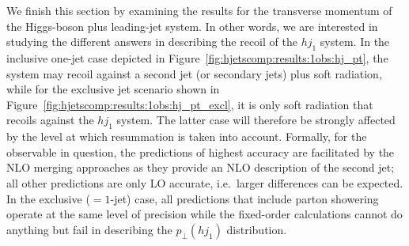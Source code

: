 We finish this section by examining the results for the transverse
momentum of the Higgs-boson plus leading-jet system. In other words,
we are interested in studying the different answers in describing the
recoil of the $hj_1$ system. In the inclusive one-jet case depicted in
Figure~\ref{fig:hjetscomp:results:1obs:hj_pt}, the system may recoil
against a second jet (or secondary jets) plus soft radiation, while
for the exclusive jet scenario shown in
Figure~\ref{fig:hjetscomp:results:1obs:hj_pt_excl}, it is only soft
radiation that recoils against the $hj_1$ system. The latter case will
therefore be strongly affected by the level at which resummation is
taken into account. Formally, for the observable in question, the
predictions of highest accuracy are facilitated by the NLO merging
approaches as they provide an NLO description of the second jet; all
other predictions are only LO accurate, i.e.~larger differences can be
expected. In the exclusive ($=1$-jet) case, all predictions that
include parton showering operate at the same level of precision
while the fixed-order calculations cannot do anything but fail in
describing the $p_\perp(hj_1)$ distribution.

